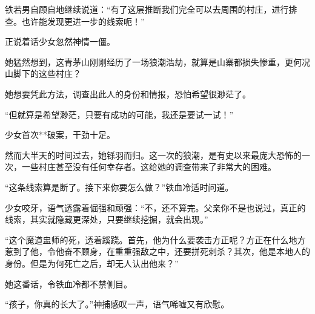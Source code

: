 \begin{this_body}
铁若男自顾自地继续说道：“有了这层推断我们完全可以去周围的村庄，进行排查。也许能发现更进一步的线索呃！”

正说着话少女忽然神情一僵。

她猛然想到，这青茅山刚刚经历了一场狼潮浩劫，就算是山寨都损失惨重，更何况山脚下的这些村庄？

她想要凭此方法，调查出此人的身份和情报，恐怕希望很渺茫了。

“但就算是希望渺茫，只要有成功的可能，我还是要试一试！”

少女首次**破案，干劲十足。

然而大半天的时间过去，她铩羽而归。这一次的狼潮，是有史以来最庞大恐怖的一次，一些村庄甚至没有任何幸存者。这给她的调查带来了非常大的困难。

“这条线索算是断了。接下来你要怎么做？”铁血冷适时问道。

少女咬牙，语气透露着倔强和顽强：“不，还不算完。父亲你不是也说过，真正的线索，其实就隐藏更深处，只要继续挖掘，就会出现。”

“这个魔道盅师的死，透着蹊跷。首先，他为什么要袭击方正呢？方正在什么地方惹到了他，令他奋不顾身，在重重强敌之中，还要拼死刺杀？其次，他是本地人的身份。但是为何死亡之后，却无人认出他来？”

她这番话，令铁血冷都不禁侧目。

“孩子，你真的长大了。”神捕感叹一声，语气唏嘘又有欣慰。

\end{this_body}

